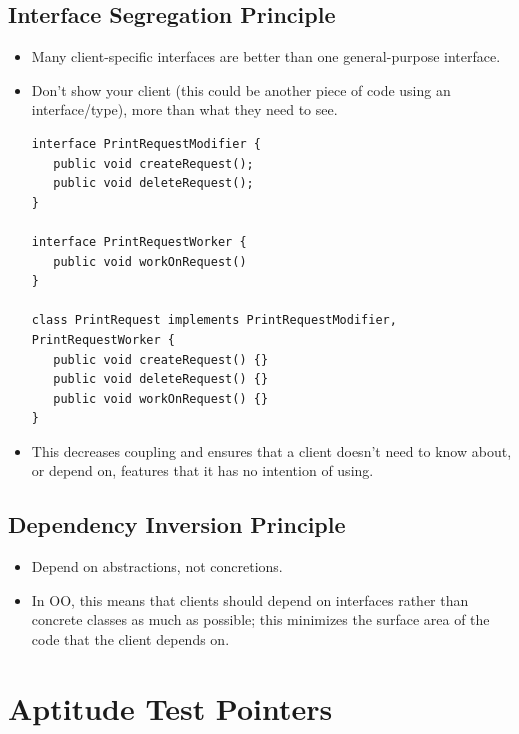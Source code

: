 \documentclass{report}
\begin{document}
\section{Interface Segregation Principle}
\begin{itemize}
\item Many client-specific interfaces are better than one general-purpose interface.
\item Don't show your client (this could be another piece of code using an interface/type), more than what they need to see.
\begin{lstlisting}
interface PrintRequestModifier {
   public void createRequest();
   public void deleteRequest();
}
 
interface PrintRequestWorker {
   public void workOnRequest()
}
 
class PrintRequest implements PrintRequestModifier, PrintRequestWorker {
   public void createRequest() {}
   public void deleteRequest() {}
   public void workOnRequest() {}
}
\end{lstlisting}
\item This decreases coupling and ensures that a client doesn't need to know about, or depend on, features that it has no intention of using.
\end{itemize}
\section{Dependency Inversion Principle}
\begin{itemize}
\item Depend on abstractions, not concretions.
\item In OO, this means that clients should depend on interfaces rather than concrete classes as much as possible; this minimizes the surface area of the code that the client depends on.
\end{itemize}
\chapter{Aptitude Test Pointers}

\end{document}
